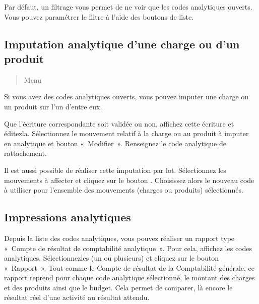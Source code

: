 \documentclass[a4paper,10pt,oneside,french]{sphinxmanual}
\begin{document}
\sphinxAtStartPar
Par défaut, un filtrage vous permet de ne voir que  les codes analytiques ouverts. Vous pouvez paramétrer le filtre à l’aide des boutons de liste.


\subsection{Imputation analytique d’une charge ou d’un produit}
\label{\detokenize{accounting/costaccounting:imputation-analytique-d-une-charge-ou-d-un-produit}}\begin{quote}

\sphinxAtStartPar
Menu 
\end{quote}

\sphinxAtStartPar
Si vous avez des codes analytiques ouverts, vous pouvez imputer une charge ou un produit sur l’un d’entre eux.
\begin{quote}

\noindent{}
\end{quote}

\sphinxAtStartPar
Que l’écriture correspondante soit validée ou non, affichez cette écriture  et éditez\sphinxhyphen{}la.
Sélectionnez le  mouvement relatif à la charge ou au produit à imputer en analytique et bouton « Modifier ».
Renseignez le code analytique de rattachement.

\sphinxAtStartPar
Il est aussi possible de réaliser cette imputation par lot.
Sélectionnez les mouvements à affecter et cliquez sur le bouton . Choisissez alors le nouveau code à utiliser
pour l’ensemble des mouvements (charges ou  produits) sélectionnés.


\subsection{Impressions analytiques}
\label{\detokenize{accounting/costaccounting:impressions-analytiques}}
\sphinxAtStartPar
Depuis la liste des codes analytiques, vous pouvez réaliser un rapport type « Compte de résultat de comptabilité analytique ».
Pour cela, affichez les codes analytiques. Sélectionnez\sphinxhyphen{}les (un ou plusieurs) et cliquez sur le bouton « Rapport ».
Tout comme le Compte de résultat de la Comptabilité générale, ce rapport reprend pour chaque code analytique sélectionné, le montant des charges et des produits ainsi que le budget. Cela permet de comparer, là encore le résultat réel d’une activité au résultat attendu.
\end{document}
